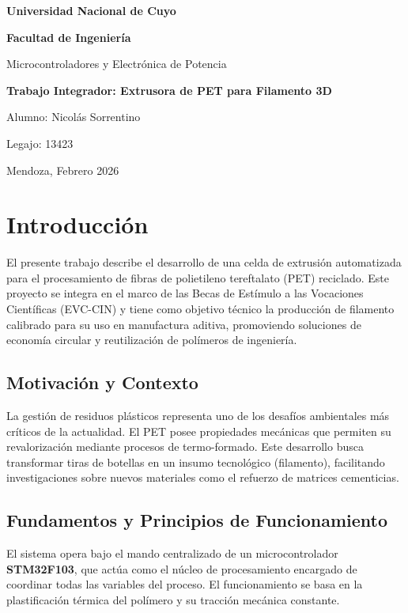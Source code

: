 \documentclass[12pt]{article}
\begin{document}
\begin{titlepage}
    \centering
    \vspace*{1cm}
    {\bfseries\LARGE Universidad Nacional de Cuyo \par}
    {\bfseries\Large Facultad de Ingeniería \par}
    \vspace{1.5cm}
    {\Large Microcontroladores y Electrónica de Potencia \par}
    \vspace{2cm}
    {\bfseries\huge Trabajo Integrador: Extrusora de PET para Filamento 3D \par}
    \vspace{2cm}
    {\Large Alumno: Nicolás Sorrentino\par} 
    {\Large Legajo: 13423 \par}
    \vfill
    {\large Mendoza, Febrero 2026 \par}
\end{titlepage}

\newpage
\tableofcontents
\newpage

\section{Introducción}
El presente trabajo describe el desarrollo de una celda de extrusión automatizada para el procesamiento de fibras de polietileno tereftalato (PET) reciclado. Este proyecto se integra en el marco de las Becas de Estímulo a las Vocaciones Científicas (EVC-CIN) y tiene como objetivo técnico la producción de filamento calibrado para su uso en manufactura aditiva, promoviendo soluciones de economía circular y reutilización de polímeros de ingeniería.

\subsection{Motivación y Contexto}
La gestión de residuos plásticos representa uno de los desafíos ambientales más críticos de la actualidad. El PET posee propiedades mecánicas que permiten su revalorización mediante procesos de termo-formado. Este desarrollo busca transformar tiras de botellas en un insumo tecnológico (filamento), facilitando investigaciones sobre nuevos materiales como el refuerzo de matrices cementicias.

\subsection{Fundamentos y Principios de Funcionamiento}
El sistema opera bajo el mando centralizado de un microcontrolador \textbf{STM32F103}, que actúa como el núcleo de procesamiento encargado de coordinar todas las variables del proceso. El funcionamiento se basa en la plastificación térmica del polímero y su tracción mecánica constante.
\end{document}
